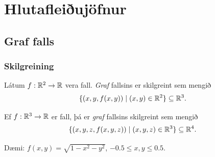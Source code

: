 
\theoremstyle{definition}
\newtheorem{exercise}[theorem]{}





\newbox\mytempbox
\newdimen\mytempdimen

\newcommand\includegraphicscopyright[3][]{%
  \leavevmode\vbox{\vskip3pt\raggedright\setbox\mytempbox=\hbox{\texttt{[image: \#2]}}%
    \mytempdimen=\wd\mytempbox\box\mytempbox\par\vskip1pt%
    \fontsize{3}{3.5}\selectfont{\color{black!25}{\vbox{\hsize=\mytempdimen#3}}}\vskip3pt%
}}

\newenvironment{colortabular}[1]{\medskip\rowcolors[]{1}{blue!20}{blue!10}\tabular{#1}\rowcolor{blue!40}}{\endtabular\medskip}

\def\equad{\leavevmode\hbox{}\quad}

\newenvironment{greencolortabular}[1]
{\medskip\rowcolors[]{1}{green!50!black!20}{green!50!black!10}%
  \tabular{#1}\rowcolor{green!50!black!40}}%
{\endtabular\medskip}





\section{Hlutafleiðujöfnur}


\subsection{Graf falls} 

\subsubsection{Skilgreining }
Látum $f:{\mathbb R}^2\rightarrow {\mathbb R}$ vera fall.  {\em Graf} fallsins er skilgreint sem mengið 
$$\{(x,y,f(x,y))\mid (x,y)\in{\mathbb R}^2\}\subseteq {\mathbb R}^3.$$

Ef $f:{\mathbb R}^3\rightarrow {\mathbb R}$ er fall, þá er  {\em graf} fallsins skilgreint sem mengið 
$$\{(x,y,z,f(x,y,z))\mid (x,y,z)\in{\mathbb R}^3\}\subseteq {\mathbb R}^4.$$

            
 Dæmi: $f(x,y) = \sqrt{1-x^2-y^2}$, $-0.5\leq x,y\leq 0.5$.         

